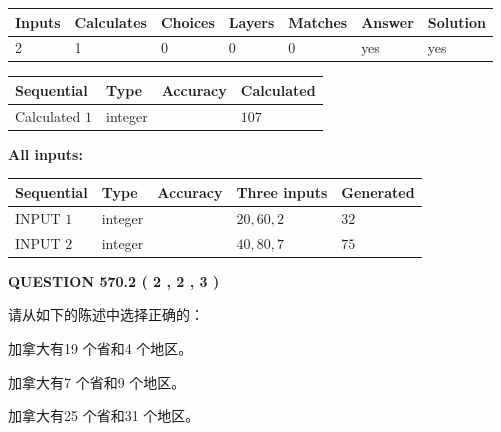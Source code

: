 \documentclass{ctexart}
\begin{document}
   
\noindent\begin{tabular}{|l|l|l|l|l|l|l|}
 \hline
Inputs & Calculates & Choices & Layers & Matches & Answer & Solution \\ \hline
 2  & 
 1  & 
 0
  & 
 0  & 
 0  & 
  yes & 
  yes 
  \\ \hline
 \end{tabular}
   
   
   
   
\noindent{}
   
   
  
  
\noindent\begin{tabular}{|l|l|l|l|}
\hline
 Sequential & Type & Accuracy & Calculated \\ 
\hline
 
 
  Calculated $  1 $ & integer &  & 
  $ 107 $ 
 \\  \hline  
 \end{tabular}
   
   
   
   
\noindent\vspace{0.1in}\hspace{-0.08in} {\textbf{\Large{All inputs: }}}
   
   
  
  
\noindent\begin{tabular}{|l|l|l|l|l|}
\hline
 Sequential & Type & Accuracy & Three inputs & Generated \\ 
\hline
 
 
  INPUT $  1 $ & integer &  & $
 20
 , 
 60
 , 
 2
 $ & $ 32 $ 
 \\  \hline  
 
 
  INPUT $  2 $ & integer &  & $
 40
 , 
 80
 , 
 7
 $ & $ 75 $ 
 \\  \hline  
 \end{tabular}
   
   
  
\vspace{0.2in}
  
{\textbf{\Large{QUESTION
570.2 
 ( 2 , 2 , 3 )
}}}
  
  
请从如下的陈述中选择正确的：
 
 
加拿大有19 个省和4 个地区。
 
 
加拿大有7 个省和9 个地区。
 
 
加拿大有25 个省和31 个地区。
 
\end{document}
